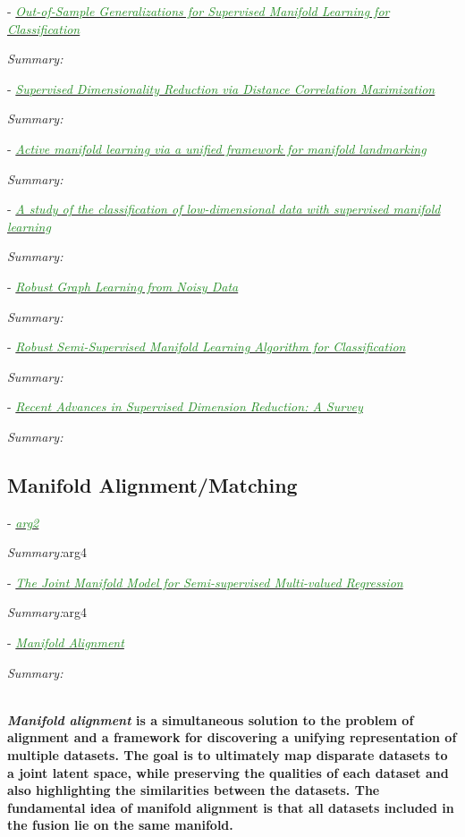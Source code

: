 \documentclass[]{article}
\newcommand{\paperentry}[4]{
            \hangindent=1cm
            \cite{#1} - \href{run:../References/#3}{\textcolor{ForestGreen}{\textit{#2}}}
            
            \noindent            
            \begin{minipage}[t]{0.1\linewidth}\hfill\end{minipage}
            \begin{minipage}[t]{0.8\linewidth}\textcolor{NavyBlue}{{\textit{Summary:}}}#4\end{minipage}
            \vspace{.25cm}
          }
\begin{document}
	\paperentry{Vural2016OutOfSampleSupManifoldLearning}
	{Out-of-Sample Generalizations for Supervised Manifold Learning for Classification}
	{Manifold_Representation_Learning/Supervised/Vural2016OutOfSampleSupManifoldLearning.pdf}
	{}
	
	
	\paperentry{Vepakomma2016SupDimRedDistanceCorrelationMax}
	{Supervised Dimensionality Reduction via Distance Correlation Maximization}
	{Manifold_Representation_Learning/Supervised/Vepakomma2016SupDimRedDistanceCorrelationMax.pdf}
	{}
	
	\paperentry{Xu2017ActiveManifoldLearning}
	{Active manifold learning via a unified framework for manifold landmarking}
	{Manifold_Representation_Learning/Supervised/Xu2017ActiveManifoldLearning.pdf}
	{}
	
	\paperentry{Vural2018StudySupervisedManifoldLearning}
	{A study of the classification of low-dimensional data with supervised manifold learning}
	{Manifold_Representation_Learning/Supervised/Vural2018StudySupervisedManifoldLearning.pdf}
	{}
	
	
	\paperentry{Kang2018ManifoldRegularizedPCA}
	{Robust Graph Learning from Noisy Data}
	{Manifold_Representation_Learning/Supervised/Kang2018ManifoldRegularizedPCA.pdf}
	{}
	

	\paperentry{Chen2018RobustSemiSupManifoldLearning}
	{Robust Semi-Supervised Manifold Learning Algorithm for Classification}
	{Manifold_Representation_Learning/Supervised/Chen2018RobustSemiSupManifoldLearning.pdf}
	{}
	
	\paperentry{Chao2019RecentAdvancesSupervisedDimRed}
	{Recent Advances in Supervised Dimension Reduction: A Survey}
	{Manifold_Representation_Learning/Supervised/Chao2019RecentAdvancesSupervisedDimRed.pdf}
	{}
	
	
	\subsection{Manifold Alignment/Matching}
	
		\paperentry{graphMatching}
		{arg2}
		{arg3}
		{arg4}
	
		\paperentry{Navaratnam2007JointManifoldSemiSupRegression}
		{The Joint Manifold Model for Semi-supervised Multi-valued Regression}
		{Manifold_Representation_Learning/Alignment/Navaratnam2007JointManifoldSemiSupRegression.pdf}
		{arg4}
	
		\paperentry{Wang2011ManifoldAlignment}
		{Manifold Alignment}
		{Manifold_Representation_Learning/Alignment/Wang2011ManifoldAlignment.pdf}
		{} \\ \textbf{\textit{Manifold alignment} is a simultaneous solution to the problem of alignment and a framework for discovering a unifying representation of multiple datasets.  The goal is  to ultimately map disparate datasets to a joint latent space, while preserving the qualities of each dataset and also highlighting the similarities between the datasets. The fundamental idea of manifold alignment is that all datasets included in the fusion lie on the same manifold.} \\ \\
			
\end{document}
